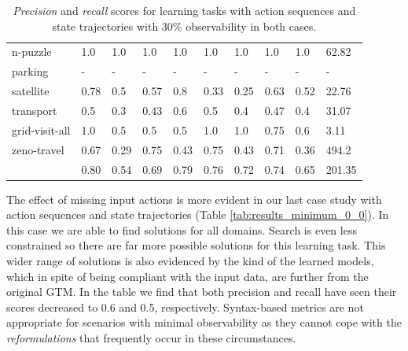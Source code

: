 \begin{table}[hbt!]
\begin{center}
\begin{footnotesize}
\begin{tabular}{l|l|l|l|l|l|l||l|l||l|}
			n-puzzle & 1.0 & 1.0 & 1.0 & 1.0 & 1.0 & 1.0 & 1.0 & 1.0& 62.82 \\ %
			parking & - & - & - & - & - & - & - & - & - \\ %
			satellite & 0.78 & 0.5 & 0.57 & 0.8 & 0.33 & 0.25 & 0.63 & 0.52& 22.76 \\ %
			transport & 0.5 & 0.3 & 0.43 & 0.6 & 0.5 & 0.4 & 0.47 & 0.4& 31.07 \\ %
			grid-visit-all & 1.0 & 0.5 & 0.5 & 0.5 & 1.0 & 1.0 & 0.75 & 0.6& 3.11 \\ %
			zeno-travel & 0.67 & 0.29 & 0.75 & 0.43 & 0.75 & 0.43 & 0.71 & 0.36& 494.2 \\ %
			\hline
			\bf & 0.80 & 0.54 & 0.69 & 0.79 & 0.76 & 0.72 & 0.74 & 0.65 & 201.35 
			
		\end{tabular}
		\end{footnotesize}
	\end{center}
	\caption{\small {\em Precision} and {\em recall} scores for learning tasks with \PO action sequences and \PO state trajectories with 30\% observability in both cases.}
	\label{tab:results_minimum_30_30}
\end{table}

The effect of missing input actions is more evident in our last case study with \NO action sequences and state trajectories (Table \ref{tab:results_minimum_0_0}). In this case we are able to find solutions for all domains. Search is even less constrained so there are far more possible solutions for this learning task. This wider range of solutions is also evidenced by the kind of the learned models, which in spite of being compliant with the input data, are further from the original GTM. In the table we find that both precision and recall have seen their scores decreased to 0.6 and 0.5, respectively. Syntax-based metrics are not appropriate for scenarios with minimal observability as they cannot cope with the \emph{reformulations} that frequently occur in these circumstances.

